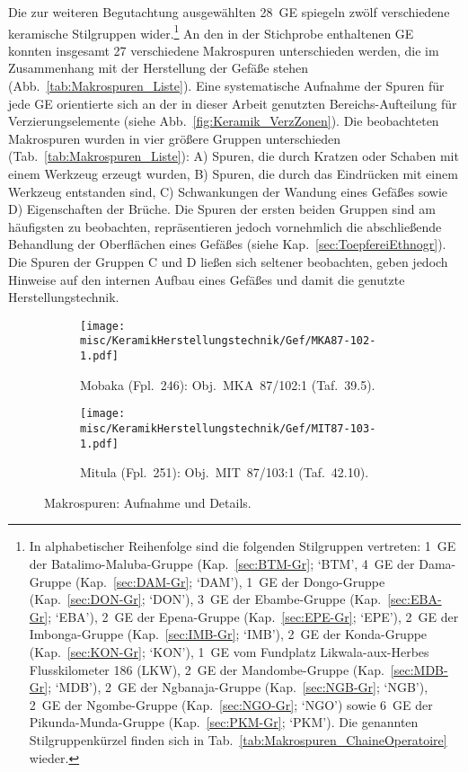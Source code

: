 \vspace{1.5em}
\noindent Die zur weiteren Begutachtung ausgewählten 28~GE spiegeln zwölf verschiedene keramische Stilgruppen wider.\footnote{In alphabetischer Reihenfolge sind die folgenden Stilgruppen vertreten: 1~GE der Batalimo-Maluba-Gruppe (Kap.~\ref{sec:BTM-Gr}; \enquote*{BTM}, 4~GE der Dama-Gruppe (Kap.~\ref{sec:DAM-Gr}; \enquote*{DAM}), 1~GE der Dongo-Gruppe (Kap.~\ref{sec:DON-Gr}; \enquote*{DON}), 3~GE der Ebambe-Gruppe (Kap.~\ref{sec:EBA-Gr}; \enquote*{EBA}), 2~GE der Epena-Gruppe (Kap.~\ref{sec:EPE-Gr}; \enquote*{EPE}), 2~GE der Imbonga-Gruppe (Kap.~\ref{sec:IMB-Gr}; \enquote*{IMB}), 2~GE der Konda-Gruppe (Kap.~\ref{sec:KON-Gr}; \enquote*{KON}), 1~GE vom Fundplatz Likwala-aux-Herbes Flusskilometer 186 (LKW), 2~GE der Mandombe-Gruppe (Kap.~\ref{sec:MDB-Gr}; \enquote*{MDB}), 2~GE der Ngbanaja-Gruppe (Kap.~\ref{sec:NGB-Gr}; \enquote*{NGB}), 2~GE der Ngombe-Gruppe (Kap.~\ref{sec:NGO-Gr}; \enquote*{NGO}) sowie 6~GE der Pikunda-Munda-Gruppe (Kap.~\ref{sec:PKM-Gr}; \enquote*{PKM}). Die genannten Stilgruppenkürzel finden sich in Tab.~\ref{tab:Makrospuren_ChaineOperatoire} wieder.\label{ftn:StilGrKurzel_UntersuchungHerstetellungstechnik}} An den in der Stichprobe enthaltenen GE konnten insgesamt 27 verschiedene Makrospuren unterschieden werden, die im Zusammenhang mit der Herstellung der Gefäße stehen (Abb.~\ref{tab:Makrospuren_Liste}). Eine systematische Aufnahme der Spuren für jede GE orientierte sich an der in dieser Arbeit genutzten Bereichs-Aufteilung für Verzierungselemente (siehe Abb.~\ref{fig:Keramik_VerzZonen}). Die beobachteten Makrospuren wurden in vier größere Gruppen unterschieden (Tab.~\ref{tab:Makrospuren_Liste}): A) Spuren, die durch Kratzen oder Schaben mit einem Werkzeug erzeugt wurden, B) Spuren, die durch das Eindrücken mit einem Werkzeug entstanden sind, C) Schwankungen der Wandung eines Gefäßes sowie D) Eigenschaften der Brüche. Die Spuren der ersten beiden Gruppen sind am häufigsten zu beobachten, repräsentieren jedoch vornehmlich die abschließende Behandlung der Oberflächen eines Gefäßes (siehe Kap.~\ref{sec:ToepfereiEthnogr}). Die Spuren der Gruppen C und D ließen sich seltener beobachten, geben jedoch Hinweise auf den internen Aufbau eines Gefäßes und damit die genutzte Herstellungstechnik.

\begin{figure*}[p]
	\centering
	\begin{subfigure}{\textwidth}
		\centering
		\texttt{[image: misc/KeramikHerstellungstechnik/Gef/MKA87-102-1.pdf]}
		\caption{Mobaka (Fpl.~246): Obj.~MKA~87/102:1 (Taf.~39.5).\vspace{1em}}
		\label{MKA87-102-1_Makrospuren}
	\end{subfigure}
	\begin{subfigure}{\textwidth}
		\centering
		\texttt{[image: misc/KeramikHerstellungstechnik/Gef/MIT87-103-1.pdf]}
		\caption{Mitula (Fpl.~251): Obj.~MIT~87/103:1 (Taf.~42.10).}
		\label{MIT87-103-1_Makrospuren}
	\end{subfigure}
	\caption{Makrospuren: Aufnahme und Details.}
\end{figure*}

